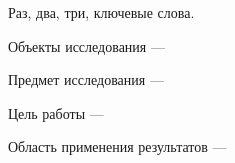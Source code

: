 \setcounter{page}{3}
\begin{essay}{
    Раз, два, три, ключевые слова.
}
\end{essay}

Объекты исследования ---

Предмет исследования ---

Цель работы ---

Область применения результатов ---